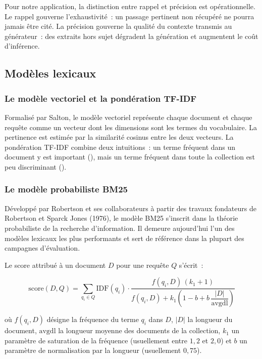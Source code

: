 Pour notre application, la distinction entre rappel et précision est
opérationnelle. Le rappel gouverne l'exhaustivité~: un passage pertinent non
récupéré ne pourra jamais être cité. La précision gouverne la qualité du
contexte transmis au générateur~: des extraits hors sujet dégradent la
génération et augmentent le coût d'inférence.

\subsection{Modèles lexicaux}

\subsubsection{Le modèle vectoriel et la pondération TF-IDF}

Formalisé par Salton, le modèle vectoriel représente chaque document et chaque
requête comme un vecteur dont les dimensions sont les termes du vocabulaire. La
pertinence est estimée par la similarité cosinus entre les deux vecteurs. La
pondération TF-IDF combine deux intuitions~: un terme fréquent dans un document
y est important (), mais un terme fréquent dans toute la
collection est peu discriminant ().

\subsubsection{Le modèle probabiliste BM25}

Développé par Robertson et ses collaborateurs à partir des travaux fondateurs de
Robertson et Sparck Jones (1976), le modèle BM25 s'inscrit dans la théorie
probabiliste de la recherche d'information. Il demeure aujourd'hui l'un des
modèles lexicaux les plus performants et sert de référence dans la plupart des
campagnes d'évaluation.

Le score attribué à un document $D$ pour une requête $Q$ s'écrit~:

\begin{equation}
  \mathrm{score}(D, Q) = \sum_{q_i \in Q}
    \mathrm{IDF}(q_i) \cdot
    \frac{f(q_i, D)\,(k_1 + 1)}
         {f(q_i, D) + k_1 \left(1 - b + b\,\dfrac{|D|}{\mathrm{avgdl}}\right)}
  \label{eq:bm25}
\end{equation}

où $f(q_i, D)$ désigne la fréquence du terme $q_i$ dans $D$, $|D|$ la longueur
du document, $\mathrm{avgdl}$ la longueur moyenne des documents de la
collection, $k_1$ un paramètre de saturation de la fréquence (usuellement entre
$1{,}2$ et $2{,}0$) et $b$ un paramètre de normalisation par la longueur
(usuellement $0{,}75$).

